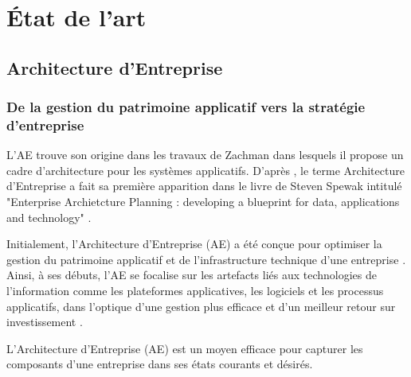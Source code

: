 \chapter{État de l'art}
\label{chap:Etat de l'art}

\section{Architecture d'Entreprise}

\subsection{De la gestion du patrimoine applicatif vers la stratégie d'entreprise}

L'AE trouve son origine dans les travaux de Zachman \cite{zachman1987framework} dans lesquels il propose un cadre d'architecture pour les systèmes applicatifs.
D'après \cite{bernard2012introduction}, le terme Architecture d'Entreprise a fait sa première apparition dans le livre de Steven Spewak intitulé "Enterprise Archietcture Planning : developing a blueprint for data, applications and technology" \cite{spewak1993enterprise}.

Initialement, l'Architecture d'Entreprise (AE) a été conçue pour optimiser la gestion du patrimoine applicatif et de l'infrastructure technique d'une entreprise \cite{kappelman2008enterprise}. Ainsi, à  ses débuts, l'AE se focalise sur les artefacts liés aux technologies de l'information comme les plateformes applicatives, les logiciels et les processus applicatifs, dans l'optique d'une gestion plus efficace et d'un meilleur retour sur investissement \cite{winter2006essential}. 




L'Architecture d'Entreprise (AE) est un moyen efficace pour capturer les composants d'une entreprise dans ses états courants et désirés.  

